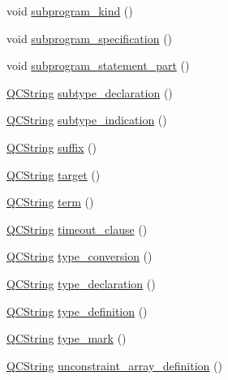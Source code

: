 \begin{DoxyCompactItemize}
\item 
void \hyperlink{classvhdl_1_1parser_1_1_vhdl_parser_a65fa84ed4393498dd6a7e42256f0eec3}{subprogram\+\_\+kind} ()
\item 
void \hyperlink{classvhdl_1_1parser_1_1_vhdl_parser_ad8b53ff39a81bef09a8f2de9edef3f0e}{subprogram\+\_\+specification} ()
\item 
void \hyperlink{classvhdl_1_1parser_1_1_vhdl_parser_a9289b8166c69c400c42970e26d9480c0}{subprogram\+\_\+statement\+\_\+part} ()
\item 
\hyperlink{class_q_c_string}{Q\+C\+String} \hyperlink{classvhdl_1_1parser_1_1_vhdl_parser_a10094f38bc334cc969e6446fc49926ec}{subtype\+\_\+declaration} ()
\item 
\hyperlink{class_q_c_string}{Q\+C\+String} \hyperlink{classvhdl_1_1parser_1_1_vhdl_parser_a81ed169d9c5a3a1653edb937950e22e2}{subtype\+\_\+indication} ()
\item 
\hyperlink{class_q_c_string}{Q\+C\+String} \hyperlink{classvhdl_1_1parser_1_1_vhdl_parser_a546e93ba0a8a0de8da433ec950fdae76}{suffix} ()
\item 
\hyperlink{class_q_c_string}{Q\+C\+String} \hyperlink{classvhdl_1_1parser_1_1_vhdl_parser_ac829665f6a728c82cd8e8ff0c2c977a4}{target} ()
\item 
\hyperlink{class_q_c_string}{Q\+C\+String} \hyperlink{classvhdl_1_1parser_1_1_vhdl_parser_a3dfffe9abefbb27e86b3a6052ac28e77}{term} ()
\item 
\hyperlink{class_q_c_string}{Q\+C\+String} \hyperlink{classvhdl_1_1parser_1_1_vhdl_parser_a0ec5efec5ffbda654cce4d4325278c29}{timeout\+\_\+clause} ()
\item 
\hyperlink{class_q_c_string}{Q\+C\+String} \hyperlink{classvhdl_1_1parser_1_1_vhdl_parser_a55a4248108cce934d6d0a36164980872}{type\+\_\+conversion} ()
\item 
\hyperlink{class_q_c_string}{Q\+C\+String} \hyperlink{classvhdl_1_1parser_1_1_vhdl_parser_a1695151b1368039236efb091dbcb0987}{type\+\_\+declaration} ()
\item 
\hyperlink{class_q_c_string}{Q\+C\+String} \hyperlink{classvhdl_1_1parser_1_1_vhdl_parser_a0e7fc657705b21064ae7a27ed93bbc7e}{type\+\_\+definition} ()
\item 
\hyperlink{class_q_c_string}{Q\+C\+String} \hyperlink{classvhdl_1_1parser_1_1_vhdl_parser_a9935bf5ba7bb2999166f86c9a15a758d}{type\+\_\+mark} ()
\item 
\hyperlink{class_q_c_string}{Q\+C\+String} \hyperlink{classvhdl_1_1parser_1_1_vhdl_parser_a911b5236931d08455a0d1f3b691413a9}{unconstraint\+\_\+array\+\_\+definition} ()

\end{DoxyCompactItemize}
